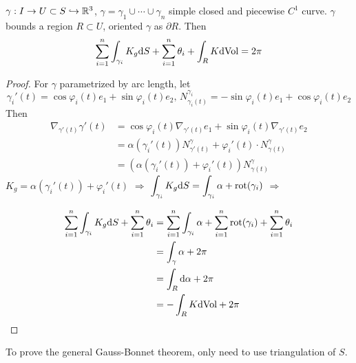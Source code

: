 \begin{theorem}
     $ \gamma:I\rightarrow U\subset S\hookrightarrow\mathbb R^3 $,  $ \gamma=\gamma_1\cup\cdots\cup\gamma_n $ simple closed and piecewise  $ C^1 $ curve.  $ \gamma $ bounds a region  $ R \subset U$, oriented  $ \gamma  $ as  $ \partial R $. Then 
    \[\sum_{i=1}^n\int_{\gamma_i}K_g\mathrm{d} S+\sum_{i=1}^n\theta_i+\int_RK\mathrm{d}\mathrm{Vol}=2\pi\]      
\end{theorem}
\begin{proof}
    For  $ \gamma $  parametrized by arc length,  let
    \[\gamma_i'(t)=\cos\varphi_i(t)e_1+\sin\varphi_i(t)e_2,\,N_{\gamma_i(t)}^{\gamma_i}=-\sin\varphi_i(t)e_1+\cos\varphi_i(t)e_2\]
    Then 
    \begin{align*}
        \nabla_{\gamma'(t)}\gamma'(t)&=\cos\varphi_i(t)\nabla_{\gamma'(t)}e_1+\sin\varphi_{i}(t)\nabla_{\gamma'(t)}e_2\\
        &=\alpha(\gamma_i'(t))N_{\gamma'(t)}^\gamma+\varphi_i'(t)\cdot N_{\gamma(t)}^\gamma\\
        &=(\alpha(\gamma_i'(t))+\varphi_i'(t))N_{\gamma(t)}^\gamma
    \end{align*}
     $ K_g=\alpha(\gamma_i'(t))+\varphi_i'(t) $ $ \Rightarrow $ $ \displaystyle\int_{\gamma_i}K_g\mathrm{d} S=\int_{\gamma_i}\alpha+\mathrm{rot}(\gamma_i) $ $ \Rightarrow $
     
    \begin{align*}
        \sum_{i=1}^n\int_{\gamma_i}K_g\mathrm{d} S+\sum_{i=1}^n\theta_i&=\sum_{i=1}^n\int_{\gamma_i}\alpha+\sum_{i=1}^n\mathrm{rot}(\gamma_i)+\sum_{i=1}^n\theta_i\\
        &=\int_\gamma\alpha+2\pi\\
        &=\int_R\mathrm{d}\alpha+2\pi\\
        &=-\int_RK\mathrm{d}\mathrm{Vol}+2\pi
    \end{align*}
\end{proof}
To prove the general Gauss-Bonnet theorem, only need to use triangulation of  $ S $. 